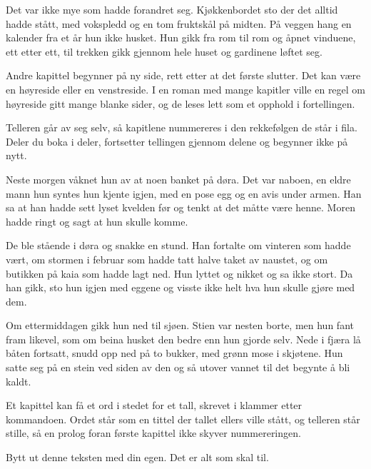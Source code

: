 \documentclass[12pt,twoside]{book}
\begin{document}
Det var ikke mye som hadde forandret seg. Kjøkkenbordet sto der det alltid hadde stått, med vokspledd og en tom fruktskål på midten. På veggen hang en kalender fra et år hun ikke husket. Hun gikk fra rom til rom og åpnet vinduene, ett etter ett, til trekken gikk gjennom hele huset og gardinene løftet seg.

\kapittel

Andre kapittel begynner på ny side, rett etter at det første slutter. Det kan være en høyreside eller en venstreside. I en roman med mange kapitler ville en regel om høyreside gitt mange blanke sider, og de leses lett som et opphold i fortellingen.

Telleren går av seg selv, så kapitlene nummereres i den rekkefølgen de står i fila. Deler du boka i deler, fortsetter tellingen gjennom delene og begynner ikke på nytt.

Neste morgen våknet hun av at noen banket på døra. Det var naboen, en eldre mann hun syntes hun kjente igjen, med en pose egg og en avis under armen. Han sa at han hadde sett lyset kvelden før og tenkt at det måtte være henne. Moren hadde ringt og sagt at hun skulle komme.

De ble stående i døra og snakke en stund. Han fortalte om vinteren som hadde vært, om stormen i februar som hadde tatt halve taket av naustet, og om butikken på kaia som hadde lagt ned. Hun lyttet og nikket og sa ikke stort. Da han gikk, sto hun igjen med eggene og visste ikke helt hva hun skulle gjøre med dem.

\scenebrudd

Om ettermiddagen gikk hun ned til sjøen. Stien var nesten borte, men hun fant fram likevel, som om beina husket den bedre enn hun gjorde selv. Nede i fjæra lå båten fortsatt, snudd opp ned på to bukker, med grønn mose i skjøtene. Hun satte seg på en stein ved siden av den og så utover vannet til det begynte å bli kaldt.

\kapittel[Epilog]

Et kapittel kan få et ord i stedet for et tall, skrevet i klammer etter kommandoen. Ordet står som en tittel der tallet ellers ville stått, og telleren står stille, så en prolog foran første kapittel ikke skyver nummereringen.

Bytt ut denne teksten med din egen. Det er alt som skal til.
\end{document}
